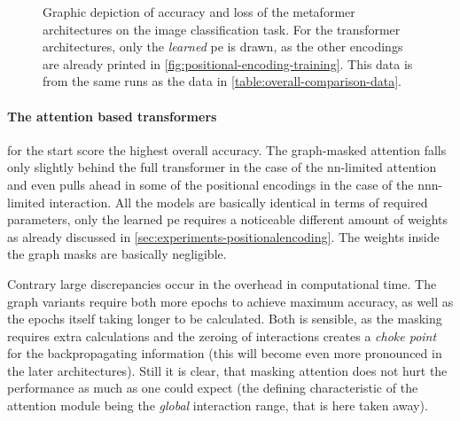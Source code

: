 \begin{figure}[p]
    \centering
    \vspace{-1cm}
    \caption{Graphic depiction of accuracy and loss of the metaformer architectures on the image classification task. 
            For the transformer architectures, only the \emph{learned} pe is drawn, as the other encodings are already printed in \autoref{fig:positional-encoding-training}. 
            This data is from the same runs as the data in \autoref{table:overall-comparison-data}.
    }
    \label{fig:overall-comparison-data}
\end{figure}

\paragraph{The attention based transformers} for the start score the highest overall accuracy. 
The graph-masked attention falls only slightly behind the full transformer in the case of the nn-limited attention and even pulls ahead in some of the positional encodings in the case of the nnn-limited interaction.
All the models are basically identical in terms of required parameters, only the learned pe requires a noticeable different amount of weights as already discussed in \autoref{sec:experiments-positionalencoding}. 
The weights inside the graph masks are basically negligible.

Contrary large discrepancies occur in the overhead in computational time.
The graph variants require both more epochs to achieve maximum accuracy, as well as the epochs itself taking longer to be calculated.
Both is sensible, as the masking requires extra calculations and the zeroing of interactions creates a \emph{choke point} for the backpropagating information (this will become even more pronounced in the later architectures). 
Still it is clear, that masking attention does not hurt the performance as much as one could expect (the defining characteristic of the attention module being the \emph{global} interaction range, that is here taken away).

